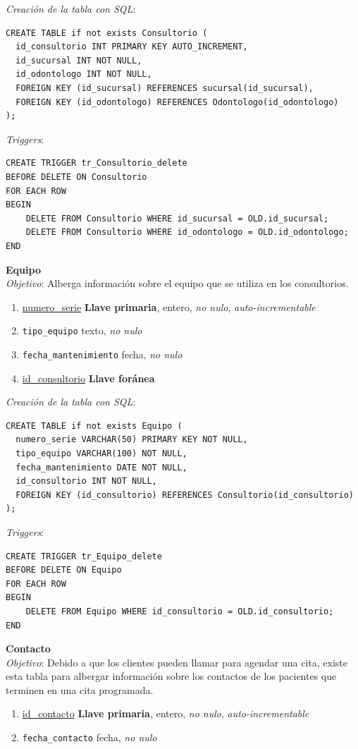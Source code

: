 \documentclass[a4paper,12pt]{article}
\begin{document}
\emph{Creación de la tabla con SQL}: 
\begin{verbatim}
CREATE TABLE if not exists Consultorio (
  id_consultorio INT PRIMARY KEY AUTO_INCREMENT,
  id_sucursal INT NOT NULL,
  id_odontologo INT NOT NULL,
  FOREIGN KEY (id_sucursal) REFERENCES sucursal(id_sucursal),
  FOREIGN KEY (id_odontologo) REFERENCES Odontologo(id_odontologo)
);
\end{verbatim}

\emph{Triggers}:

\begin{verbatim}
CREATE TRIGGER tr_Consultorio_delete
BEFORE DELETE ON Consultorio
FOR EACH ROW
BEGIN
    DELETE FROM Consultorio WHERE id_sucursal = OLD.id_sucursal;
    DELETE FROM Consultorio WHERE id_odontologo = OLD.id_odontologo;
END
\end{verbatim}

\textbf{Equipo} \\ \emph{Objetivo}: Alberga información sobre el equipo que se utiliza en los consultorios.
\begin{enumerate}
	\item \underline{numero\_serie} \textbf{Llave primaria}, entero, \emph{no nulo}, \textit{auto-incrementable}
	\item \texttt{tipo\_equipo} texto, \emph{no nulo}
	\item \texttt{fecha\_mantenimiento} fecha, \emph{no nulo}
	\item \underline{id\_consultorio} \textbf{Llave foránea}
\end{enumerate}

\emph{Creación de la tabla con SQL}: 
\begin{verbatim}
CREATE TABLE if not exists Equipo (
  numero_serie VARCHAR(50) PRIMARY KEY NOT NULL,
  tipo_equipo VARCHAR(100) NOT NULL,
  fecha_mantenimiento DATE NOT NULL,
  id_consultorio INT NOT NULL,
  FOREIGN KEY (id_consultorio) REFERENCES Consultorio(id_consultorio)
);
\end{verbatim}

\emph{Triggers}:

\begin{verbatim}
CREATE TRIGGER tr_Equipo_delete
BEFORE DELETE ON Equipo
FOR EACH ROW
BEGIN
    DELETE FROM Equipo WHERE id_consultorio = OLD.id_consultorio;
END
\end{verbatim}



\textbf{Contacto} \\ \emph{Objetivo}: Debido a que los clientes pueden llamar para agendar una cita, existe esta tabla para albergar información sobre los contactos de los pacientes que terminen en una cita programada.
\begin{enumerate}
	\item \underline{id\_contacto} \textbf{Llave primaria}, entero, \emph{no nulo}, \textit{auto-incrementable}
	\item \texttt{fecha\_contacto} fecha, \emph{no nulo}
\end{enumerate}
\end{document}
